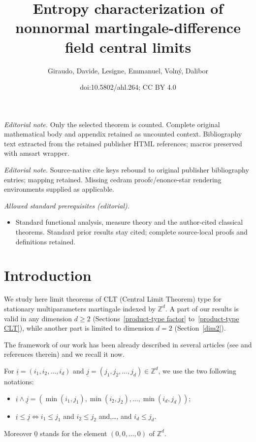 \documentclass[10pt]{amsart}
\title{Entropy characterization of nonnormal martingale-difference field central limits}
\author{Giraudo, Davide, Lesigne, Emmanuel, Volný, Dalibor}
\date{doi:10.5802/ahl.264; CC BY 4.0}
\theoremstyle{definition}\newtheorem{defi}[theo]{Definition}\newtheorem{rema}[theo]{Remark}\newtheorem{exam}[theo]{Example}\newtheorem{exem}[theo]{Example}\newtheorem{nota}[theo]{Notation}
\newcommand{\Z}{\mathbb{Z}}
\begin{document}
\maketitle
\noindent\textit{Editorial note.} Only the selected theorem is counted. Complete original mathematical body and appendix retained as uncounted context. Bibliography text extracted from the retained publisher HTML references; macros preserved with amsart wrapper.\par\medskip
\noindent\textit{Editorial note.} Source-native cite keys rebound to original publisher bibliography entries; mapping retained. Missing cedram proofc/enonce-star rendering environments supplied as applicable.\par\medskip
\noindent\textit{Allowed standard prerequisites (editorial).}\begin{itemize}
\item Standard functional analysis, measure theory and the author-cited classical theorems. Standard prior results stay cited; complete source-local proofs and definitions retained.
\end{itemize}\medskip

\section{Introduction}\label{introduction}

We study here limit theorems of CLT (Central Limit Theorem) type for stationary multiparameters martingale indexed by $\Z^d$. {A part of our results is valid in any dimension $d\geq2$ (Sections~\ref{product-type factor} to~\ref{product-type CLT}), while another part is limited to dimension $d=2$ (Section~\ref{dim2}).}

The framework of our work has been already described in several articles (see \cite{MR3913270} and references therein) and we recall it now.

For $\underline{i}=(i_1,i_2,\dots,i_d)$ and $\underline{j}=(j_1,j_2,\dots,j_d)\in
\Z^d$, we use the two following notations:
\begin{itemize}
\item $\underline{i}\wedge\underline{j}=(\min(i_1,j_1),\min(i_2,j_2),\dots,
\min(i_d,j_d))$;
\item
$\underline{i}\leq\underline{j}\Leftrightarrow i_1\leq j_1$ and $i_2\leq j_2$ and,\dots, and $i_d\leq j_d$.
\end{itemize}
Moreover $\underline{0}$ stands for the element $(0,0,\dots,0)$ of $\Z^d$.
\end{document}
